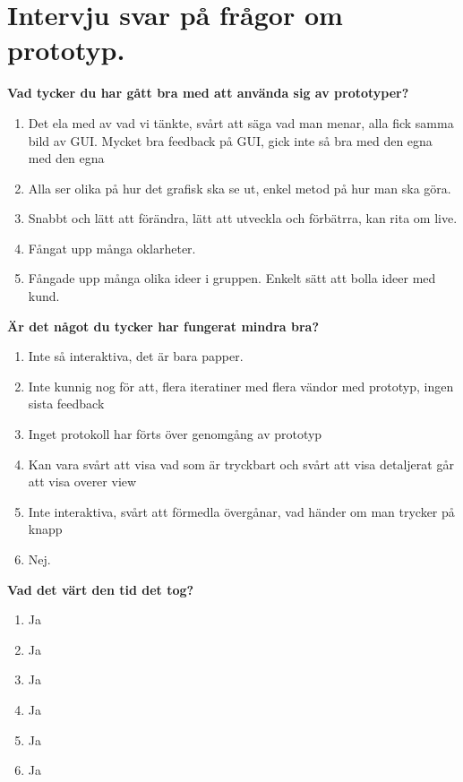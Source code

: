 \chapter{Intervju svar på frågor om prototyp.}\label{appendix:niclas}

	\textbf{Vad tycker du har gått bra med att använda sig av prototyper?} 
	\begin{enumerate}
	\item Det ela med av vad vi tänkte, svårt att säga vad man menar, alla fick samma bild av GUI.
	 Mycket bra feedback på GUI, gick inte så bra med den egna med den egna 
	\item Alla ser olika på hur det grafisk ska se ut, enkel metod på hur man ska göra. 
	\item Snabbt och lätt att förändra, lätt att utveckla och förbätrra, kan rita om live. 
	\item Fångat upp många oklarheter. 
	\item Fångade upp många olika ideer i gruppen. Enkelt sätt att bolla ideer med kund.
	\end{enumerate}		
	
 	\textbf{Är det något du tycker har fungerat mindra bra?} 
 	\begin{enumerate}
 	\item Inte så interaktiva, det är bara papper.
	\item Inte kunnig nog för att, flera iteratiner med flera vändor med prototyp, ingen sista feedback
	\item Inget protokoll har förts över genomgång av prototyp
	\item Kan vara svårt att visa vad som är tryckbart och svårt att visa detaljerat går att visa overer view
	\item Inte interaktiva, svårt att förmedla övergånar, vad händer om man trycker på knapp
	\item Nej.
	
 	\end{enumerate}
 	
 	\textbf{Vad det värt den tid det tog?} 
 	\begin{enumerate}
 	\item Ja
	\item Ja 
	\item Ja 
	\item Ja 
	\item Ja   
	\item Ja 

 	\end{enumerate}
 
